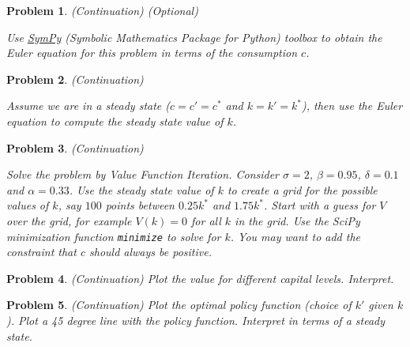 \documentclass[12pt, a4paper]{article}
\newtheorem{problem}{Problem}
\begin{document}
\begin{problem}
(Continuation) (Optional)

Use \href{https://www.sympy.org/en/index.html}{SymPy} (Symbolic Mathematics Package for Python) toolbox to obtain the Euler equation for this problem in terms of the consumption \(c\).
\end{problem}

\begin{problem}
(Continuation)

Assume we are in a steady state (\(c=c'=c^*\) and \(k=k'=k^*\)), then use the Euler equation to compute the steady state value of \(k\).
\end{problem}

\begin{problem}
(Continuation)

Solve the problem by Value Function Iteration.
Consider \(\sigma=2\), \(\beta=0.95\), \(\delta=0.1\) and \(\alpha=0.33\).
Use the steady state value of \(k\) to create a grid for the possible values of \(k\), say \(100\) points between \(0.25 k^*\) and \(1.75 k^*\).
Start with a guess for \(V\) over the grid, for example \(V(k)=0\) for all \(k\) in the grid.
Use the SciPy minimization function \texttt{minimize} to solve for \(k\).
You may want to add the constraint that \(c\) should always be positive.
\end{problem}

\begin{problem}
(Continuation)
Plot the value for different capital levels. Interpret.
\end{problem}

\begin{problem}
(Continuation)
Plot the optimal policy function (choice of \(k'\) given \(k\)).
Plot a 45 degree line with the policy function.
Interpret in terms of a steady state.
\end{problem}
\end{document}
